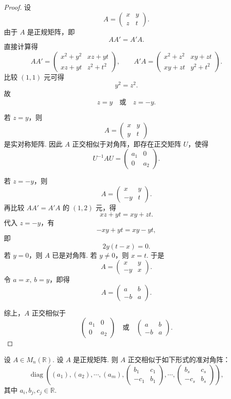 \begin{proof}
	设
	\[
	A=
	\begin{pmatrix}
		x&y\\
		z&t
	\end{pmatrix}.
	\]
	由于 $A$ 是正规矩阵，即
	\[
	AA'=A'A.
	\]
	直接计算得
	\[
	AA'=
	\begin{pmatrix}
		x^2+y^2&xz+yt\\
		xz+yt&z^2+t^2
	\end{pmatrix},
	\qquad
	A'A=
	\begin{pmatrix}
		x^2+z^2&xy+zt\\
		xy+zt&y^2+t^2
	\end{pmatrix}.
	\]
	比较 $(1,1)$ 元可得
	\[
	y^2=z^2.
	\]
	故
	\[
	z=y \quad \text{或} \quad z=-y.
	\]
	
	若 $z=y$，则
	\[
	A=
	\begin{pmatrix}
		x&y\\
		y&t
	\end{pmatrix}
	\]
	是实对称矩阵. 因此 $A$ 正交相似于对角阵，即存在正交矩阵 $U$，使得
	\[
	U^{-1}AU=
	\begin{pmatrix}
		a_1&0\\
		0&a_2
	\end{pmatrix}.
	\]
	
	若 $z=-y$，则
	\[
	A=
	\begin{pmatrix}
		x&y\\
		-y&t
	\end{pmatrix}.
	\]
	再比较 $AA'=A'A$ 的 $(1,2)$ 元，得
	\[
	xz+yt=xy+zt.
	\]
	代入 $z=-y$，有
	\[
	-xy+yt=xy-yt,
	\]
	即
	\[
	2y(t-x)=0.
	\]
	若 $y=0$，则 $A$ 已是对角阵. 若 $y\ne0$，则 $x=t$. 于是
	\[
	A=
	\begin{pmatrix}
		x&y\\
		-y&x
	\end{pmatrix}.
	\]
	令 $a=x,\ b=y$，即得
	\[
	A=
	\begin{pmatrix}
		a&b\\
		-b&a
	\end{pmatrix}.
	\]
	
	综上，$A$ 正交相似于
	\[
	\begin{pmatrix}
		a_1&0\\
		0&a_2
	\end{pmatrix}
	\quad \text{或} \quad
	\begin{pmatrix}
		a&b\\
		-b&a
	\end{pmatrix}.
	\]
\end{proof}
\begin{theorem}
	设 $A\in M_n(\mathbb{R})$. 设 $A$ 是正规矩阵. 则 $A$ 正交相似于如下形式的准对角阵：
	\[
	\operatorname{diag}\left(
	(a_1),(a_2),\cdots,(a_m),
	\begin{pmatrix}b_1&c_1\\-c_1&b_1\end{pmatrix},
	\cdots,
	\begin{pmatrix}b_s&c_s\\-c_s&b_s\end{pmatrix}
	\right),
	\]
	其中 $a_i,b_j,c_j\in\mathbb{R}$.
\end{theorem}


